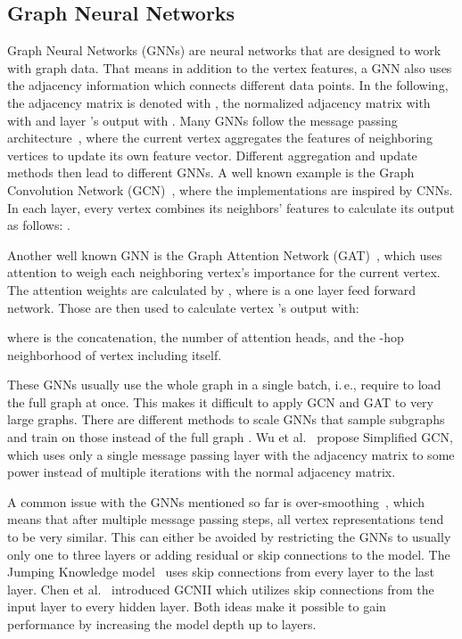 \documentclass[runningheads]{llncs}
\newcommand{\ie}{i.\,e.,\xspace}
\begin{document}
\subsection{Graph Neural Networks}

Graph Neural Networks (GNNs) are neural networks that are designed to work with graph data.
That means in addition to the vertex features, a GNN also uses the adjacency information which connects different data points.
In the following, the adjacency matrix is denoted with , the normalized adjacency matrix with  with  and layer 's output with .
Many GNNs follow the message passing architecture~\cite{Hamilton2020graph,DBLP:journals/aiopen/ZhouCHZYLWLS20}, where the current vertex aggregates the features of neighboring vertices to update its own feature vector.
Different aggregation and update methods then lead to different GNNs.
A well known example is the Graph Convolution Network (GCN)~\cite{Kipf17gcn}, where the implementations are inspired by CNNs.
In each layer, every vertex combines its neighbors' features to calculate its output as follows: 
.

Another well known GNN is the Graph Attention Network (GAT)~\cite{Velickovic18gat}, which uses attention to weigh each neighboring vertex's importance for the current vertex.
The attention weights are calculated by , where  is a one layer feed forward network.
Those are then used to calculate vertex 's output with:

where  is the concatenation,  the number of attention heads, and  the -hop neighborhood of vertex  including itself.


These GNNs usually use the whole graph in a single batch, \ie require to load the full graph at once.
This makes it difficult to apply GCN and GAT to very large graphs.
There are different methods to scale GNNs that sample subgraphs and train on those instead of the full graph \cite{ChenZS18,graphSage,graphsaint-iclr20}.
Wu et al.~\cite{Wu19sgcn} propose Simplified GCN, which uses only a single message passing layer with the adjacency matrix to some power instead of multiple iterations with the normal adjacency matrix.

A common issue with the GNNs mentioned so far is over-smoothing~\cite{Hamilton2020graph}, which means that after multiple message passing steps, all vertex representations tend to be very similar.
This can either be avoided by restricting the GNNs to usually only one to three layers or adding residual or skip connections to the model.
The Jumping Knowledge model~\cite{jkn} uses skip connections from every layer to the last layer.
Chen et al.~\cite{gcnII} introduced GCNII which utilizes skip connections from the input layer to every hidden layer.
Both ideas make it possible to gain performance by increasing the model depth up to  layers.
\end{document}
